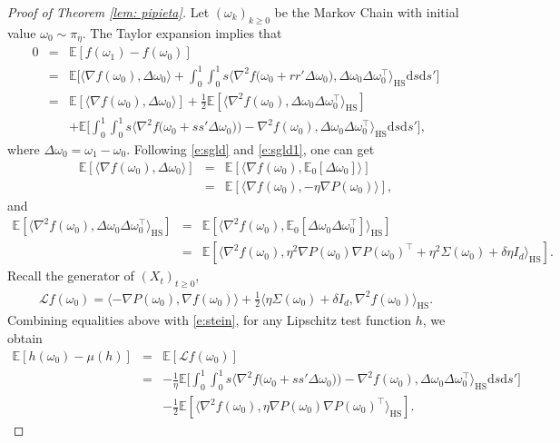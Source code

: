 \documentclass[12pt]{amsart}
\theoremstyle{definition}
\theoremstyle{remark}
\numberwithin{equation}{section}
\newcommand{\dif}{\mathrm{d}}
\newcommand{\E}{\mathbb{E}}            %
\newcommand{\Ll}{\langle}
\newcommand{\Rr}{\rangle}
\begin{document}
\begin{proof}[Proof of Theorem \ref{lem: pipieta}]
Let $(\omega_k)_{k\ge0}$ be the Markov Chain with initial value $\omega_0\sim\pi_\eta$. The Taylor expansion implies that
\begin{eqnarray}\label{e:lem3.1.1}
0&=&\E[f(\omega_1)-f(\omega_0)]\nonumber\\
&=&\E\big[\Ll \nabla f(\omega_0), \Delta\omega_0 \Rr
+\int_0^1\int_0^1 s\Ll \nabla^2f\big(\omega_0+rr'\Delta\omega_0\big),\Delta\omega_0\Delta\omega_0^\top    \Rr_{\text {HS}}\dif s\dif s'\big]\nonumber\\
&=&\E[\Ll \nabla f(\omega_0), \Delta\omega_0 \Rr]+\frac12\E[\Ll \nabla^2f (\omega_0),\Delta\omega_0\Delta\omega_0^\top     \Rr_{\text {HS}}]\nonumber\\
&&+\E\big[\int_0^1\int_0^1 s\Ll \nabla^2f\big(\omega_0+ss'\Delta\omega_0)\big)-\nabla^2f(\omega_0),\Delta\omega_0\Delta\omega_0^\top    \Rr_{\text {HS}}\dif s\dif s'\big],
\end{eqnarray}
where $\Delta \omega_0=\omega_1-\omega_0$. Following \eqref{e:sgld} and \eqref{e:sgld1}, one can get
\begin{eqnarray*}
	\E[\Ll \nabla f(\omega_0), \Delta \omega_0 \Rr]&=&\E[\Ll \nabla f(\omega_0), \E_0[\Delta \omega_0] \Rr]\\
	&=&\E[\Ll \nabla f(\omega_0),-\eta\nabla P(\omega_{0})\Rr],
\end{eqnarray*}
and
\begin{eqnarray*}
	\E[\Ll \nabla^2f (\omega_0),\Delta \omega_0\Delta \omega_0^\top     \Rr_{\text {HS}}]
	&=&\E[\Ll \nabla^2f (\omega_0),\E_0[\Delta \omega_0\Delta \omega_0^\top]     \Rr_{\text {HS}}]\\
	&=&\E[\Ll \nabla^2f (\omega_0), \eta^2\nabla P(\omega_{0})\nabla P(\omega_{0})^\top+\eta^2\Sigma(\omega_0)+\delta\eta I_d    \Rr_{\text {HS}}].
\end{eqnarray*}
Recall the generator of $(X_t)_{t\ge0}$, 
\begin{eqnarray*}
\mathcal L f(\omega_0)=\Ll -\nabla P(\omega_0), \nabla f(\omega_0) \Rr+\frac1 2\Ll \eta\Sigma(\omega_0)+\delta I_d,\nabla^2f(\omega_0) \Rr_{\text{HS}}.
\end{eqnarray*}
Combining equalities above with \eqref{e:stein}, for any Lipschitz test function $h$, we obtain
\begin{eqnarray}\label{e:lem3.1.2}
\E[h(\omega_0)-\mu(h)]&=&\E[\mathcal L f(\omega_0)]\nonumber\\
&=& -\frac1\eta \E\big[\int_0^1\int_0^1 s\Ll \nabla^2f\big(\omega_0+ss'\Delta\omega_0)\big)-\nabla^2f(\omega_0),\Delta\omega_0\Delta\omega_0^\top     \Rr_{\text {HS}}\dif s\dif s'\big]\\
&&-\frac12\E[\Ll  \nabla^2f(\omega_0),\eta\nabla P(\omega_0)\nabla P(\omega_0)^\top
 \Rr_{\text{HS}}].\nonumber
\end{eqnarray}



\end{proof}
\end{document}
